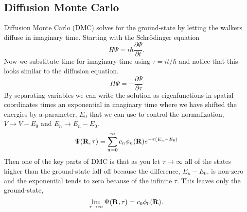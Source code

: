 \subsection{Diffusion Monte Carlo}
Diffusion Monte Carlo (DMC) solves for the ground-state by letting the walkers diffuse in imaginary time. Starting with the Schr\"odinger equation
\begin{equation}
   H\Psi = i\hbar\frac{\partial\Psi}{\partial t}.
\end{equation}
Now we substitute time for imaginary time using $\tau=it/\hbar$ and notice that this looks similar to the diffusion equation.
\begin{equation}
   H\Psi = -\frac{\partial\Psi}{\partial\tau}
\end{equation}
By separating variables we can write the solution as eigenfunctions in spatial coordinates times an exponential in imaginary time where we have shifted the energies by a parameter, $E_0$ that we can use to control the normalization, $V\rightarrow V - E_0$ and $E_n \rightarrow E_n-E_0$.
\begin{equation}
   \Psi(\mathbf{R},\tau) = \sum\limits_{n=0}^\infty c_n\phi_n(\mathbf{R})e^{-\tau(E_n-E_0)}
\end{equation}
Then one of the key parts of DMC is that as you let $\tau\rightarrow\infty$ all of the states higher than the ground-state fall off because the difference, $E_n-E_0$, is non-zero and the exponential tends to zero because of the infinite $\tau$. This leaves only the ground-state,
\begin{equation}
   \lim\limits_{\tau\rightarrow\infty}\Psi(\mathbf{R},\tau) = c_0\phi_0(\mathbf{R}).
\end{equation}

